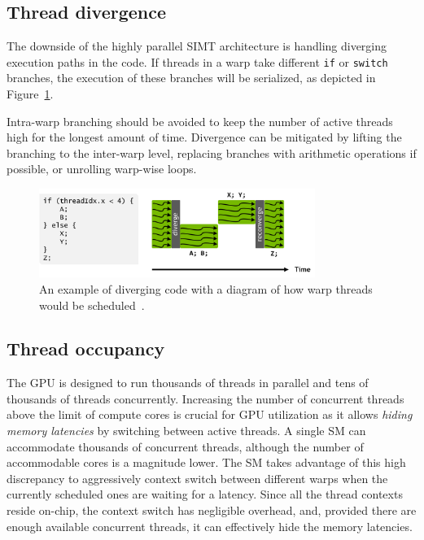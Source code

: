 \subsection{Thread divergence}
\label{sec:divergence}

The downside of the highly parallel SIMT architecture is handling diverging execution paths in the code. If threads in a warp take different \texttt{if} or \texttt{switch} branches, the execution of these branches will be serialized, as depicted in Figure~\ref{fig:divergence}.

Intra-warp branching should be avoided to keep the number of active threads high for the longest amount of time. Divergence can be mitigated by lifting the branching to the inter-warp level, replacing branches with arithmetic operations if possible, or unrolling warp-wise loops.

\begin{figure}
    \centering
    \includegraphics[width=0.8\textwidth]{img/divergence.png}
    \caption{An example of diverging code with a diagram of how warp threads would be scheduled~\cite{site:volta}.}
    \label{fig:divergence}
\end{figure}

\subsection{Thread occupancy}
\label{sec:occupancy}

The GPU is designed to run thousands of threads in parallel and tens of thousands of threads concurrently. Increasing the number of concurrent threads above the limit of compute cores is crucial for GPU utilization as it allows \emph{hiding memory latencies} by switching between active threads. A single SM can accommodate thousands of concurrent threads, although the number of accommodable cores is a magnitude lower. The SM takes advantage of this high discrepancy to aggressively context switch between different warps when the currently scheduled ones are waiting for a latency. Since all the thread contexts reside on-chip, the context switch has negligible overhead, and, provided there are enough available concurrent threads, it can effectively hide the memory latencies.

